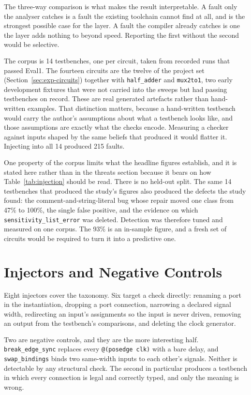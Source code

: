\documentclass[11pt,a4paper,titlepage=false]{scrreprt}
\begin{document}
The three-way comparison is what makes the result interpretable. A fault only the analyser
catches is a fault the existing toolchain cannot find at all, and is the strongest possible
case for the layer. A fault the compiler already catches is one the layer adds nothing to
beyond speed. Reporting the first without the second would be selective.

The corpus is 14 testbenches, one per circuit, taken from recorded runs that passed Eval1.
The fourteen circuits are the twelve of the project set (Section~\ref{sec:exp-circuits})
together with \texttt{half\_adder} and \texttt{mux2to1}, two early development fixtures that
were not carried into the sweeps but had passing testbenches on record. These are real
generated artefacts rather than hand-written examples. That distinction matters, because a
hand-written testbench would carry the author's assumptions about what a testbench looks
like, and those assumptions are exactly what the checks encode. Measuring a checker against
inputs shaped by the same beliefs that produced it would flatter it. Injecting into all 14
produced 215 faults.

One property of the corpus limits what the headline figures establish, and it is stated here
rather than in the threats section because it bears on how Table~\ref{tab:injection} should
be read. There is no held-out split. The same 14 testbenches that produced the study's
figures also produced the defects the study found: the comment-and-string-literal bug whose
repair moved one class from 47\% to 100\%, the single false positive, and the evidence on
which \texttt{sensitivity\_list\_error} was deleted. Detection was therefore tuned and
measured on one corpus. The 93\% is an in-sample figure, and a fresh set of circuits would be
required to turn it into a predictive one.

\section{Injectors and Negative Controls}\label{sec:val-injectors}

Eight injectors cover the taxonomy. Six target a check directly: renaming a port in the
instantiation, dropping a port connection, narrowing a declared signal width, redirecting
an input's assignments so the input is never driven, removing an output from the
testbench's comparisons, and deleting the clock generator.

Two are negative controls, and they are the more interesting half. \texttt{break\_edge\_sync}
replaces every \texttt{@(posedge clk)} with a bare delay, and \texttt{swap\_bindings} binds
two same-width inputs to each other's signals. Neither is detectable by any structural
check. The second in particular produces a testbench in which every connection is legal and
correctly typed, and only the meaning is wrong.
\end{document}
